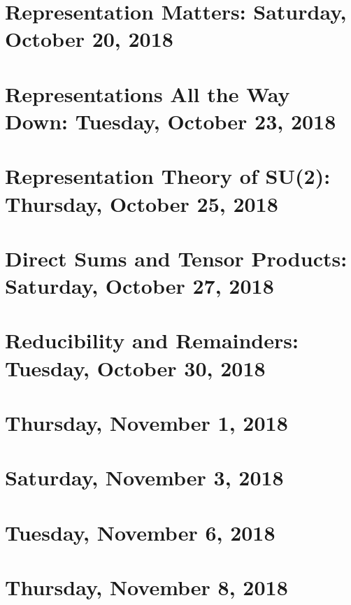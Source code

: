 \documentclass[reqno]{amsart}
\begin{document}
\section{Representation Matters: Saturday, October 20, 2018}
    
\section{Representations All the Way Down: Tuesday, October 23, 2018}
    
\section{Representation Theory of SU(2): Thursday, October 25, 2018}
    
\section{Direct Sums and Tensor Products: Saturday, October 27, 2018}
    
\section{Reducibility and Remainders: Tuesday, October 30, 2018}
    
\section{Thursday, November 1, 2018}
    
\section{Saturday, November 3, 2018}
    
\section{Tuesday, November 6, 2018}
    
\section{Thursday, November 8, 2018}
    
\end{document}
